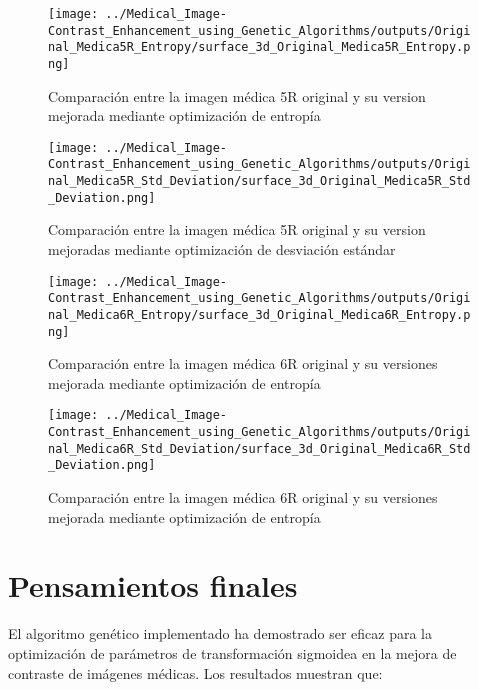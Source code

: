 \begin{figure}[H]
    \centering
    \texttt{[image: ../Medical\_Image-Contrast\_Enhancement\_using\_Genetic\_Algorithms/outputs/Original\_Medica5R\_Entropy/surface\_3d\_Original\_Medica5R\_Entropy.png]}
    \caption{Comparación entre la imagen médica 5R original y su version mejorada mediante optimización de entropía}
    \label{fig:comparacion_5R_Entropia}
\end{figure}

\begin{figure}[H]
    \centering
    \texttt{[image: ../Medical\_Image-Contrast\_Enhancement\_using\_Genetic\_Algorithms/outputs/Original\_Medica5R\_Std\_Deviation/surface\_3d\_Original\_Medica5R\_Std\_Deviation.png]}
    \caption{Comparación entre la imagen médica 5R original y su version mejoradas mediante optimización de desviación estándar}
    \label{fig:comparacion_5R_std}
\end{figure}

\begin{figure}[H]
    \centering
    \texttt{[image: ../Medical\_Image-Contrast\_Enhancement\_using\_Genetic\_Algorithms/outputs/Original\_Medica6R\_Entropy/surface\_3d\_Original\_Medica6R\_Entropy.png]}
    \caption{Comparación entre la imagen médica 6R original y su versiones mejorada mediante optimización de entropía}
    \label{fig:comparacion_6R_Entropia}
\end{figure}

\begin{figure}[H]
    \centering
    \texttt{[image: ../Medical\_Image-Contrast\_Enhancement\_using\_Genetic\_Algorithms/outputs/Original\_Medica6R\_Std\_Deviation/surface\_3d\_Original\_Medica6R\_Std\_Deviation.png]}
    \caption{Comparación entre la imagen médica 6R original y su versiones mejorada mediante optimización de entropía}
    \label{fig:comparacion_6R_Entropia}
\end{figure}
\newpage
\section{Pensamientos finales}

El algoritmo genético implementado ha demostrado ser eficaz para la optimización de parámetros de transformación sigmoidea en la mejora de contraste de imágenes médicas. Los resultados muestran que:

